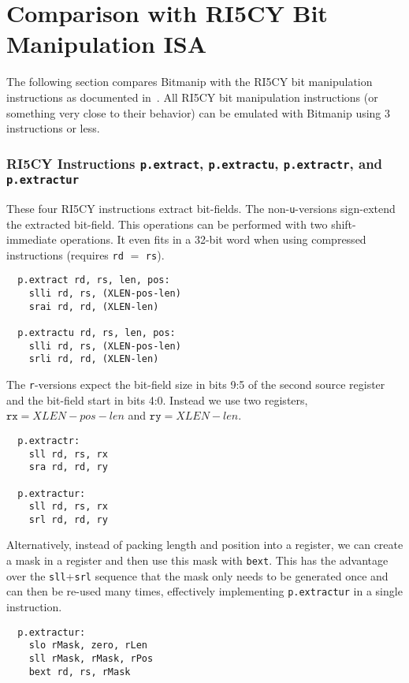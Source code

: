 \section{Comparison with RI5CY Bit Manipulation ISA}

The following section compares Bitmanip with the RI5CY bit manipulation
instructions as documented in~\cite{Ri5cy}. All RI5CY bit manipulation
instructions (or something very close to their behavior) can be emulated with
Bitmanip using 3 instructions or less.

\subsubsection{RI5CY Instructions {\tt p.extract}, {\tt p.extractu}, {\tt p.extractr}, and {\tt p.extractur}}

These four RI5CY instructions extract bit-fields. The non-{\tt u}-versions sign-extend
the extracted bit-field. This operations can be performed with two shift-immediate
operations. It even fits in a 32-bit word when using compressed instructions (requires
{\tt rd} $=$ {\tt rs}).

\begin{verbatim}
  p.extract rd, rs, len, pos:
    slli rd, rs, (XLEN-pos-len)
    srai rd, rd, (XLEN-len)

  p.extractu rd, rs, len, pos:
    slli rd, rs, (XLEN-pos-len)
    srli rd, rd, (XLEN-len)
\end{verbatim}

The {\tt r}-versions expect the bit-field size in bits 9:5 of the second source
register and the bit-field start in bits 4:0. Instead we use two registers,
$\texttt{rx} = XLEN-pos-len$ and $\texttt{ry} = XLEN-len$.

\begin{verbatim}
  p.extractr:
    sll rd, rs, rx
    sra rd, rd, ry

  p.extractur:
    sll rd, rs, rx
    srl rd, rd, ry
\end{verbatim}

Alternatively, instead of packing length and position into a register, we
can create a mask in a register and then use this mask with {\tt bext}. This
has the advantage over the {\tt sll}+{\tt srl} sequence that the mask only needs
to be generated once and can then be re-used many times, effectively implementing
{\tt p.extractur} in a single instruction.

\begin{verbatim}
  p.extractur:
    slo rMask, zero, rLen
    sll rMask, rMask, rPos
    bext rd, rs, rMask
\end{verbatim}

